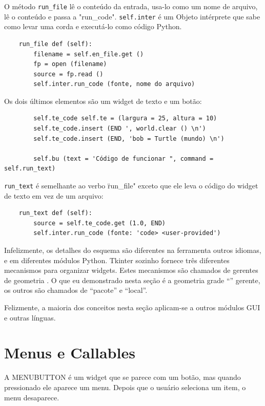 \documentclass[10pt]{book}
\begin{document}
\begin{exercise}
\begin{v erbatim}
\begin{itemize}
\end{itemize} 

O método \verb "run_file" lê o conteúdo da entrada,
usa-lo como um nome de arquivo, lê o conteúdo
e passa a \verbo "run_code". {\tt self.inter} é um
Objeto intérprete que sabe como levar uma corda e
executá-lo como código Python.

\begin{verbatim}
    run_file def (self):
        filename = self.en_file.get ()
        fp = open (filename)
        source = fp.read ()
        self.inter.run_code (fonte, nome do arquivo)
\end{verbatim}
%
Os dois últimos elementos são um widget de texto e um botão:

\begin{verbatim}
        self.te_code self.te = (largura = 25, altura = 10)
        self.te_code.insert (END ', world.clear () \n')
        self.te_code.insert (END, 'bob = Turtle (mundo) \n')

        self.bu (text = 'Código de funcionar ", command = self.run_text)
\end{verbatim}
%
\Verb "run_text" é semelhante ao verbo \"run_file" exceto que ele leva
o código do widget de texto em vez de um arquivo:

\begin{verbatim}
    run_text def (self):
        source = self.te_code.get (1.0, END)
        self.inter.run_code (fonte: 'code> <user-provided')
\end{verbatim}
%
Infelizmente, os detalhes do esquema são diferentes na ferramenta
outros idiomas, e em diferentes módulos Python.
Tkinter sozinho fornece três diferentes mecanismos para organizar
widgets. Estes mecanismos são chamados de gerentes de geometria {\bf}.
O que eu demonstrado nesta seção é a geometria grade ``''
gerente, os outros são chamados de ``pacote'' e ``local''.

Felizmente, a maioria dos conceitos nesta seção aplicam-se a
outros módulos GUI e outras línguas.


\section{Menus e Callables}

A MENUBUTTON é um widget que se parece com um botão, mas quando pressionado
ele aparece um menu. Depois que o usuário seleciona um item, o menu
desaparece.


\end{v erbatim}
\end{exercise}
\end{document}
